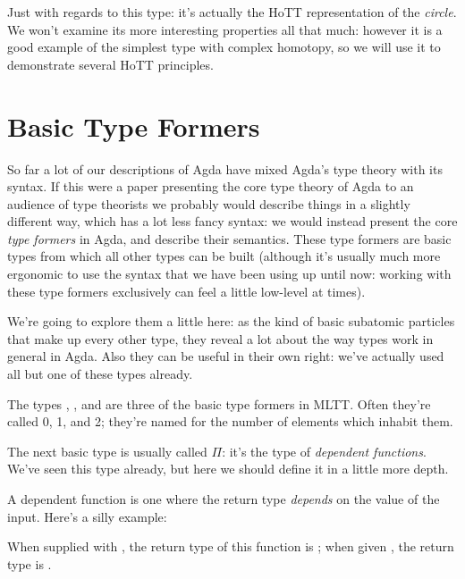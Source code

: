 Just with regards to this  type: it's actually the
HoTT representation of the \emph{circle}.
We won't examine its more interesting properties all that much: however it is a
good example of the simplest type with complex homotopy, so we will use it to
demonstrate several HoTT principles.
\section{Basic Type Formers}
So far a lot of our descriptions of Agda have mixed Agda's type theory with its
syntax.
If this were a paper presenting the core type theory of Agda to an audience of
type theorists we probably would describe things in a slightly different way,
which has a lot less fancy syntax: we would instead present the core \emph{type
  formers} in Agda, and describe their semantics.
These type formers are basic types from which all other types can be built
(although it's usually much more ergonomic to use the syntax that we have been
using up until now: working with these type formers exclusively can feel a
little low-level at times).

We're going to explore them a little here: as the kind of basic subatomic
particles that make up every other type, they reveal a lot about the way types
work in general in Agda.
Also they can be useful in their own right: we've actually used all but one of
these types already.

The types \agdabot, \agdatop, and  are three of the basic
type formers in MLTT.
Often they're called 0, 1, and 2; they're named for the number of elements which
inhabit them.

The next basic type is usually called \(\Pi\): it's the type of \emph{dependent
  functions}.
We've seen this type already, but here we should define it in a little more
depth.
\begin{definition}
  A dependent function is one where the return type \emph{depends} on the value
  of the input.
  Here's a silly example:
  \begin{agdalisting*}
  \end{agdalisting*}
  When supplied with , the return type of this
  function is ; when given , the
  return type is .
\end{definition}

